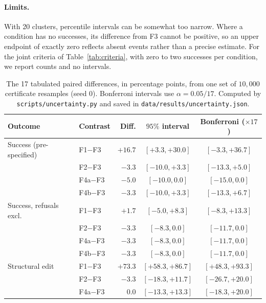 \documentclass{article}
\begin{document}
\paragraph{Limits.} With 20 clusters, percentile intervals can be somewhat too
narrow. Where a condition has no successes, its difference from F3 cannot be
positive, so an upper endpoint of exactly zero reflects absent events rather than
a precise estimate. For the joint criteria of Table~\ref{tab:criteria}, with zero
to two successes per condition, we report counts and no intervals.

\begin{table}[h]
\centering
\small
\caption{The 17 tabulated paired differences, in percentage points, from one set
of $10{,}000$ certificate resamples (seed 0). Bonferroni intervals use
$\alpha = 0.05/17$. Computed by \texttt{scripts/\allowbreak uncertainty.py} and
saved in \texttt{data/\allowbreak results/\allowbreak uncertainty.json}.}
\label{tab:allci}
\begin{tabular}{@{}llrcc@{}}
\toprule
\textbf{Outcome} & \textbf{Contrast} & \textbf{Diff.} & \textbf{$95\%$ interval} & \textbf{Bonferroni ($\times 17$)} \\
\midrule
Success (pre-specified) & F1$-$F3  & $+16.7$ & $[+3.3,+30.0]$   & $[-3.3,+36.7]$ \\
                         & F2$-$F3  & $-3.3$  & $[-10.0,+3.3]$   & $[-13.3,+5.0]$ \\
                         & F4a$-$F3 & $-5.0$  & $[-10.0,0.0]$    & $[-15.0,0.0]$ \\
                         & F4b$-$F3 & $-3.3$  & $[-10.0,+3.3]$   & $[-13.3,+6.7]$ \\
\addlinespace
Success, refusals excl.  & F1$-$F3  & $+1.7$  & $[-5.0,+8.3]$    & $[-8.3,+13.3]$ \\
                         & F2$-$F3  & $-3.3$  & $[-8.3,0.0]$     & $[-11.7,0.0]$ \\
                         & F4a$-$F3 & $-3.3$  & $[-8.3,0.0]$     & $[-11.7,0.0]$ \\
                         & F4b$-$F3 & $-3.3$  & $[-8.3,0.0]$     & $[-11.7,0.0]$ \\
\addlinespace
Structural edit          & F1$-$F3  & $+73.3$ & $[+58.3,+86.7]$  & $[+48.3,+93.3]$ \\
                         & F2$-$F3  & $-3.3$  & $[-18.3,+11.7]$  & $[-26.7,+20.0]$ \\
                         & F4a$-$F3 & $0.0$   & $[-13.3,+13.3]$  & $[-18.3,+20.0]$ \\

\end{tabular}
\end{table}
\end{document}
